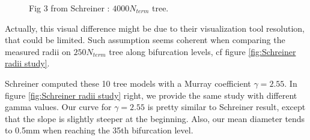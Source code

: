 \documentclass[a4paper, 11pt]{article} %
\begin{document}
\begin{figure}[htbp]
\centering
{}
\caption{Fig 3 from Schreiner \cite{schreiner1993computer} : $4000 N_{term}$ tree.}
\label{fig:Schreiner result}
\end{figure}

Actually, this visual difference might be due to their visualization tool resolution, that could be limited.
Such assumption seems coherent when comparing the measured radii on $250 N_{term}$ tree along bifurcation levels, cf figure \ref{fig:Schreiner radii study}. 

Schreiner computed these 10 tree models with a Murray coefficient $\gamma =2.55$. In figure \ref{fig:Schreiner radii study} right, we provide the same study with different gamma values. Our curve for $\gamma = 2.55$ is pretty similar to Schreiner result, except that the slope is slightly steeper at the beginning. Also, our mean diameter tends to 0.5mm when reaching the 35th bifurcation level.
\end{document}
